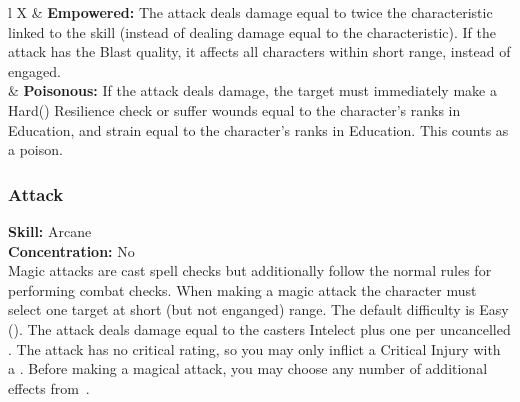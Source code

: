 \begin{table*}[!htb]
\begin{GenesysTable}{l X}
\difficulty\difficulty  & \textbf{Empowered:} The attack deals damage equal to twice the characteristic linked to the skill (instead
                            of dealing damage equal to the characteristic). If the attack has the  Blast quality, it affects
                            all characters within short range, instead of engaged.\\
\difficulty\difficulty  & \textbf{Poisonous:} If the attack deals damage, the target must immediately make a
                            Hard(\difficulty\difficulty\difficulty) Resilience check or suffer wounds equal to the character's
                            ranks in Education, and strain equal to the character's ranks in Education. This counts as a poison.\\
\end{GenesysTable}
\label{table:magic_attack}
\end{table*}

\subsubsection{Attack}
\textbf{Skill:} Arcane\\
\textbf{Concentration:} No\\
Magic attacks are cast spell checks but additionally follow the normal rules for
performing combat checks. When making a magic attack the character must select
one target at short (but not enganged) range. The default difficulty is Easy
(\difficulty). The attack deals damage equal to the casters Intelect plus one
per uncancelled \success. The attack has no critical rating, so you may only
inflict a Critical Injury with a \triumph.
Before making a magical attack, you may choose any number of additional effects
from~.

